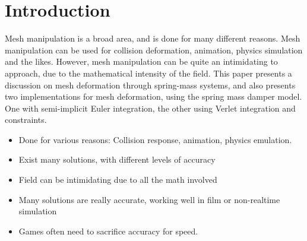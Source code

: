 \chapter{Introduction}
\label{chap:introduction}
Mesh manipulation is a broad area, and is done for many different reasons.
Mesh manipulation can be used for collision deformation, animation, physics simulation and the likes. 
However, mesh manipulation can be quite an intimidating to approach, due to the mathematical intensity of the field.
This paper presents a discussion on mesh deformation through spring-mass systems, and also presents two implementations for mesh deformation,
using the spring mass damper model. One with semi-implicit Euler integration, the other using Verlet integration and constraints.

\think
{
    \begin{itemize}
        \item Done for various reasons: Collision response, animation, physics emulation.
        \item Exist many solutions, with different levels of accuracy
        \item Field can be intimidating due to all the math involved
        \item Many solutions are really accurate, working well in film or non-realtime simulation
        \item Games often need to sacrifice accuracy for speed.
    \end{itemize}
}

